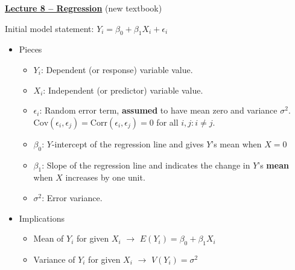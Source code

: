 \documentclass{article}
\newcommand{\bu}[1]{\textbf{\ul{#1}}}				%
\begin{document}
{\large \bu{Lecture 8 -- Regression}} (new textbook)\bigskip

Initial model statement: $Y_i = \beta_0 + \beta_1 X_i + \epsilon_i$
\begin{itemize}
    \item Pieces
    \begin{itemize}
        \item $Y_i$: Dependent (or response) variable value.
        \item $X_i$: Independent (or predictor) variable value. 
        \item $\epsilon_i$: Random error term, \textbf{assumed} to have mean zero and variance $\sigma^2$. \\$\mathrm{Cov}(\epsilon_i, \epsilon_j) = \mathrm{Corr}(\epsilon_i, \epsilon_j) = 0$ for all $i,j : i \ne j$.
        \item $\beta_0$: $Y$-intercept of the regression line and gives $Y$'s mean when $X = 0$
        \item $\beta_1$: Slope of the regression line and indicates the change in $Y$'s \textbf{mean} when $X$ increases by one unit.
        \item $\sigma^2$: Error variance.
    \end{itemize}
    \item Implications
    \begin{itemize}
        \item Mean of $Y_i$ for given $X_i$ $\rightarrow$ $E(Y_i) = \beta_0 + \beta_1 X_i$
        \item Variance of $Y_i$ for given $X_i$ $\rightarrow$ $V(Y_i) = \sigma^2$
    \end{itemize}
\end{itemize}\bigskip
\end{document}
